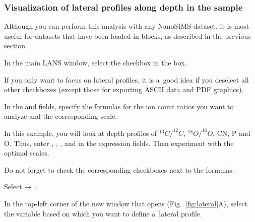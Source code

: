 \subsubsection{Visualization of lateral profiles along depth in the sample}
\setcounter{step}{0}

Although you can perform this analysis with any NanoSIMS dataset, it is most useful for datasets that have been loaded in blocks, as described in the previous section.

\s In the main LANS window, select the  checkbox in the  box. 

\bul If you only want to focus on lateral profiles, it is a~good idea if you deselect all other checkboxes (except those for exporting ASCII data and PDF graphics).

\s In the  and  fields, specify the formulas for the ion count ratios you want to analyze and the corresponding scale. 

\bul In this example, you will look at depth profiles of ${}^{13}C/^{12}C$, ${}^{18}O/^{16}O$, CN, P and O. Thus, enter , , ,  and  in the expression fields. Then experiment with the optimal scales.

\bul Do not forget to check the corresponding checkboxes next to the formulas.

\s Select  $\rightarrow$ . 

\s In the top-left corner of the new window that opens (Fig.~\ref{fig:lateral}A), select the variable based on which you want to define a~lateral profile.


